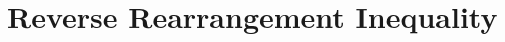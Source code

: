 \documentclass{subfile}
\begin{document}
	\chapter{Reverse Rearrangement Inequality}\label{ch:reverse}
\end{document}
